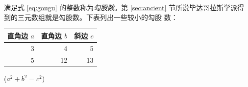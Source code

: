 \documentclass[UTF8]{ctexart}
\begin{document}
满足式 \eqref{eq:gougu} 的整数称为\emph{勾股数}。第 \ref{sec:ancient}
节所说毕达哥拉斯学派得到的三元数组就是勾股数。下表列出一些较小的勾股
数：
\begin{table}[H]
  \begin{tabular}{|rrr|}
    \hline
    直角边 $a$ & 直角边 $b$ & 斜边 $c$\\
    \hline
    3 & 4 & 5 \\
    5 & 12 & 13 \\
    \hline
  \end{tabular}%
  \qquad
  ($a^2 + b^2 = c^2$)
\end{table}

\nocite{Shiye} 

\end{document}
